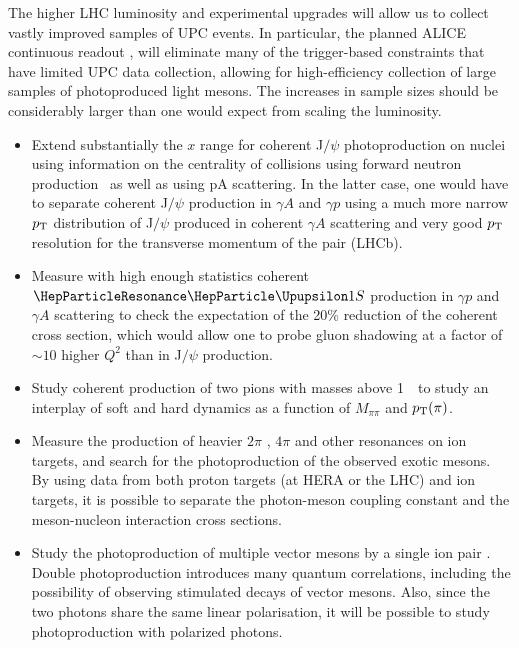 \documentclass[../report.tex]{subfiles}
\begin{document}
The higher LHC luminosity and experimental upgrades will allow us to collect vastly improved samples of UPC events.   In particular, the planned ALICE continuous readout \cite{Krivda:2017sto}, will eliminate many of the trigger-based constraints that have limited UPC data collection, allowing for high-efficiency collection of large samples of photoproduced light mesons.   The increases in sample sizes should be considerably larger than one would expect from scaling the luminosity.  
\begin{itemize}
\item
Extend substantially the $x$ range for coherent J$/\psi$ photoproduction on nuclei
using information on the centrality of collisions using forward neutron production~\cite{Guzey:2013jaa}
 as well as using pA scattering. In the latter case, one would have to separate coherent J$/\psi$ production in $\gamma A$ and $\gamma p$  using a much more narrow $p\sb{\scriptstyle\mathrm{T}}$ distribution of J$/\psi $ produced in coherent $\gamma A$ scattering
 and very good $p\sb{\scriptstyle\mathrm{T}}$ resolution for the transverse momentum of the pair (LHCb).
\item
Measure with high enough  statistics coherent $\PGUP{1S}$ production in $\gamma p$ and $\gamma A$
scattering to check the expectation of the 20\% reduction of the coherent cross section, which would allow one to probe gluon shadowing at a factor of $\sim 10 $ higher $Q^2$ than in J$/\psi$ production.
\item
Study coherent production of two pions with masses above 1~\UGeVcc\ to study an interplay of soft and hard dynamics as a function of $M_{\pi \pi}$ and $p\sb{\scriptstyle\mathrm{T}}(\pi)$.   
\item
Measure the production of heavier $2\pi$ \cite{Klein:2016dtn}, $4\pi$ and other resonances on ion targets, and search for the photoproduction of the observed exotic mesons.  
By using data from both proton targets (at HERA or the LHC) and ion targets, it is possible to separate the photon-meson coupling constant and the meson-nucleon interaction cross sections.  
\item
Study the photoproduction of multiple vector mesons by a single ion pair \cite{Klein:1999qj}.   Double photoproduction introduces many quantum correlations, including the possibility of observing stimulated decays of vector mesons.  Also, since the two photons share the same linear polarisation, it will be possible to study photoproduction with polarized photons.

\end{itemize}
\end{document}
